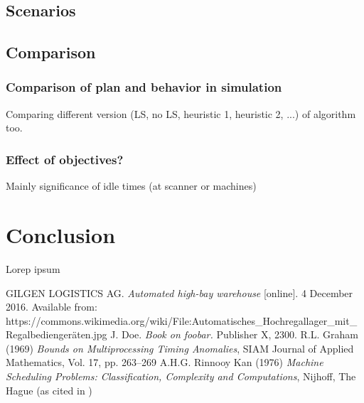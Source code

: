 \documentclass{ctuthesis}
\begin{document}
\section{Scenarios}
\section{Comparison}
\subsection{Comparison of plan and behavior in simulation}
Comparing different version (LS, no LS, heuristic 1, heuristic 2, ...) of algorithm too.
\subsection{Effect of objectives?}
Mainly significance of idle times (at scanner or machines)
\chapter{Conclusion}

Lorep ipsum \cite{doe}

\begin{thebibliography}{1}
 GILGEN LOGISTICS AG. \emph{Automated high-bay warehouse} [online]. 4 December 2016. Available from: https://commons.wikimedia.org/wiki/File:Automatisches\_Hochregallager\_mit\_Regalbediengeräten.jpg
 J. Doe. \emph{Book on foobar.} Publisher X,
 2300.
  R.L. Graham (1969) \emph{Bounds on Multiprocessing Timing Anomalies}, SIAM
Journal of Applied Mathematics, Vol. 17, pp. 263–269
 A.H.G. Rinnooy Kan (1976) \emph{Machine Scheduling Problems: Classification,
Complexity and Computations}, Nijhoff, The Hague (as cited in \cite{pinedo})


\end{thebibliography}
\end{document}
